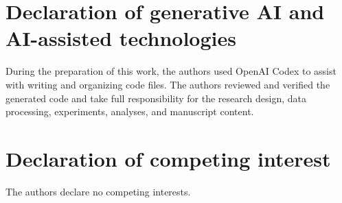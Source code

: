\documentclass[a4paper,fleqn]{cas-sc}
\begin{document}
\section*{Declaration of generative AI and AI-assisted technologies}
During the preparation of this work, the authors used OpenAI Codex to assist with writing and organizing code files. The authors reviewed and verified the generated code and take full responsibility for the research design, data processing, experiments, analyses, and manuscript content.
\section*{Declaration of competing interest}
The authors declare no competing interests.


\end{document}
